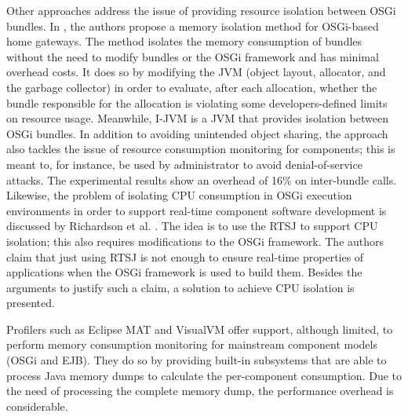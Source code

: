 Other approaches address the issue of providing resource isolation between OSGi bundles.
In \cite{Kuroda2014}, the authors propose a memory isolation method for OSGi-based home gateways.
The method isolates the memory consumption of bundles without the need to modify bundles or the OSGi framework and has minimal overhead costs.
It does so by modifying the JVM (object layout, allocator, and the garbage collector) in order to evaluate, after each allocation, whether the bundle responsible for the allocation is violating some developers-defined limits on resource usage.
Meanwhile, I-JVM \cite{dsn/09/geoffray/ijvm} is a JVM that provides isolation between OSGi bundles.
In addition to avoiding unintended object sharing, the approach also tackles the issue of resource consumption monitoring for components; this is meant to, for instance, be used by administrator to avoid denial-of-service attacks.
The experimental results show an overhead of 16\% on inter-bundle calls.
Likewise, the problem of isolating CPU consumption in OSGi execution environments in order to support real-time component software development is discussed by Richardson et al. \cite{Richardson2009}.
The idea is to use the \gls{RTSJ} to support CPU isolation; this also requires modifications to the OSGi framework.
The authors claim that just using RTSJ is not enough to ensure real-time properties of applications when the OSGi framework is used to build them.
Besides the arguments to justify such a claim, a solution to achieve CPU isolation is presented.

Profilers such as Eclipse MAT and VisualVM offer support, although limited, to perform memory consumption monitoring for mainstream component models (OSGi and EJB).
They do so by providing built-in subsystems that are able to process Java memory dumps to calculate the per-component consumption.
Due to the need of processing the complete memory dump, the performance overhead is considerable. 




